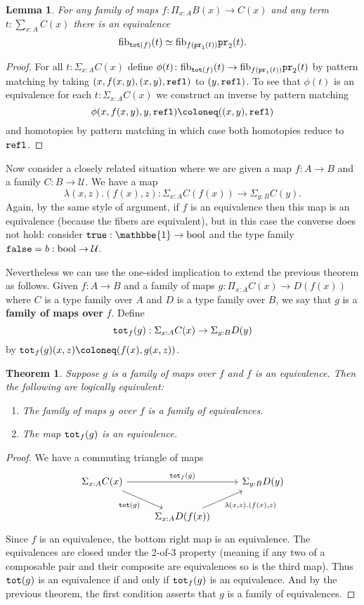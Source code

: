 \documentclass{amsart}
\theoremstyle{theorem}
\newtheorem*{thm}{Theorem}
\newtheorem*{lem}{Lemma}
\theoremstyle{definition}
\theoremstyle{remark}
\newcommand{\0}{\mathbbe{0}}
\newcommand{\1}{\mathbbe{1}}
\newcommand{\2}{\mathbbe{2}}
\newcommand{\3}{\mathbbe{3}}
\newcommand{\4}{\mathbbe{4}}
\newcommand{\term}[1]{{\textup{\texttt{#1}}}}
\newcommand{\type}[1]{{\textup{#1}}}
\newcommand{\pr}{\term{pr}}
\newcommand{\refl}{\term{refl}}
\newcommand{\UU}{{\mathcal{U}}}
\newcommand{\bool}{\type{bool}}
\newcommand{\true}{\term{true}}
\newcommand{\false}{\term{false}}
\newcommand{\fib}{\type{fib}}
\begin{document}
\begin{lem} For any  family of maps $f \colon \Pi_{x:A} B(x) \to C(x)$ and any term $t : \sum_{x:A}C(x)$ there is an equivalence
\[
\fib_{\term{tot}(f)}(t) \simeq \fib_{f(\pr_1(t))}\pr_2(t).\]
\end{lem}
\begin{proof}
For all ${t: \Sigma_{x:A}C(x)}$ define $\phi(t) \colon  \fib_{\term{tot}(f)}(t) \to \fib_{f(\pr_1(t))}\pr_2(t)$ by pattern matching by taking $(x,f(x,y),(x,y), \refl)$ to $(y,\refl)$. To see that $\phi(t)$ is an equivalence for each $t : \Sigma_{x:A}C(x)$ we construct an inverse by pattern matching \[ \phi(x,f(x,y),y, \refl) \coloneq ((x,y),\refl)\] and homotopies by pattern matching in which case both homotopies reduce to $\refl$.
\end{proof}

Now consider a closely related situation where we are given a map $f \colon A \to B$ and a family $C \colon B \to \UU$. We have a map
\[ \lambda(x,z).(f(x),z): \Sigma_{x:A} C(f(x)) \to \Sigma_{y :B}C(y).\]
Again, by the same style of argument, if $f$ is an equivalence then this map is an equivalence (because the fibers are equivalent), but in this case the converse does not hold: consider $\true : \1 \to \bool$ and the type family $\false = b : \bool \to \UU$.

Nevertheless we can use the one-sided implication to extend the previous theorem as follows. Given $f \colon A \to B$ and a family of maps $g : \Pi_{x:A}C(x) \to D(f(x))$ where $C$ is a type family over $A$ and $D$ is a type family over $B$, we say that $g$ is a \textbf{family of maps over} $f$. Define
\[ \term{tot}_f(g) : \Sigma_{x:A}C(x) \to \Sigma_{y:B}D(y)\] by $\term{tot}_f(g)(x,z) \coloneq (f(x),g(x,z))$.

\begin{thm} Suppose $g$ is a family of maps over $f$ and $f$ is an equivalence. Then the following are logically equivalent:
\begin{enumerate}
\item The family of maps $g$ over $f$ is a family of equivalences.
\item The map $\term{tot}_f(g)$ is an equivalence.
\end{enumerate}
\end{thm}
\begin{proof}
We have a commuting triangle of maps
\[
\begin{tikzcd} \Sigma_{x:A}C(x) \arrow[rr, "\term{tot}_f(g)"] \arrow[dr, "\term{tot}(g)"'] & & \Sigma_{y:B}D(y) \\ & \Sigma_{x:A}D(f(x)) \arrow[ur, "{\lambda(x,z).(f(x),z)}"'] 
\end{tikzcd}
\]
Since $f$ is an equivalence, the bottom right map is an equivalence. The equivalences are closed under the 2-of-3 property (meaning if any two of a composable pair and their composite are equivalences so is the third map). Thus $\term{tot}(g)$ is an equivalence if and only if $\term{tot}_f(g)$ is an equivalence. And by the previous theorem, the first condition asserts that $g$ is a family of equivalences.
\end{proof}
\end{document}
